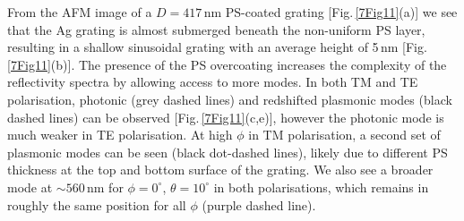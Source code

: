 From the AFM image of a $D=417$\,nm PS-coated grating [Fig.\,\ref{7Fig11}(a)] we see that the Ag grating is almost submerged beneath the non-uniform PS layer, resulting in a shallow sinusoidal grating with an average height of 5\,nm [Fig.\,\ref{7Fig11}(b)]. The presence of the PS overcoating increases the complexity of the reflectivity spectra by allowing access to more modes. In both TM and TE polarisation, photonic (grey dashed lines) and redshifted plasmonic modes (black dashed lines) can be observed [Fig.\,\ref{7Fig11}(c,e)], however the photonic mode is much weaker in TE polarisation. At high $\phi$ in TM polarisation, a second set of plasmonic modes can be seen (black dot-dashed lines), likely due to different PS thickness at the top and bottom surface of the grating. We also see a broader mode at $\sim560$\,nm for $\phi=0^{\circ}$, $\theta=10^{\circ}$ in both polarisations, which remains in roughly the same position for all $\phi$ (purple dashed line).

